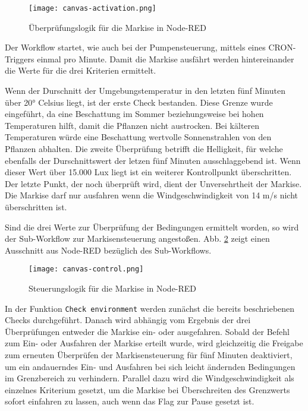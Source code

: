 \begin{figure}[h]
  \centering
  \texttt{[image: canvas-activation.png]}
  \caption{Überprüfungslogik für die Markise in Node-RED}\label{fig:canvas-activation}
\end{figure}

Der Workflow startet, wie auch bei der Pumpensteuerung, mittels eines CRON-Triggers einmal pro Minute. Damit die Markise ausfährt werden hintereinander die Werte für die drei Kriterien ermittelt.

Wenn der Durschnitt der Umgebungstemperatur in den letzten fünf Minuten über 20° Celsius liegt, ist der erste Check bestanden. Diese Grenze wurde eingeführt, da eine Beschattung im Sommer beziehungsweise bei hohen Temperaturen hilft, damit die Pflanzen nicht austrocken. Bei kälteren Temperaturen würde eine Beschattung wertvolle Sonnenstrahlen von den Pflanzen abhalten. Die zweite Überprüfung betrifft die Helligkeit, für welche ebenfalls der Durschnittswert der letzen fünf Minuten ausschlaggebend ist. Wenn dieser Wert über 15.000 Lux liegt ist ein weiterer Kontrollpunkt überschritten. Der letzte Punkt, der noch überprüft wird, dient der Unversehrtheit der Markise. Die Markise darf nur ausfahren wenn die Windgeschwindigkeit von 14 m/s nicht überschritten ist.

Sind die drei Werte zur Überprüfung der Bedingungen ermittelt worden, so wird der Sub-Workflow zur Markisensteuerung angestoßen. Abb. \ref{fig:canvas-control} zeigt einen Ausschnitt aus Node-RED bezüglich des Sub-Workflows.

\begin{figure}[h]
  \centering
  \texttt{[image: canvas-control.png]}
  \caption{Steuerungslogik für die Markise in Node-RED}\label{fig:canvas-control}
\end{figure}

In der Funktion \texttt{Check environment} werden zunächst die bereits beschriebenen Checks durchgeführt. Danach wird abhängig vom Ergebnis der drei Überprüfungen entweder die Markise ein- oder ausgefahren.
Sobald der Befehl zum Ein- oder Ausfahren der Markise erteilt wurde, wird gleichzeitig die Freigabe zum erneuten Überprüfen der Markisensteuerung für fünf Minuten deaktiviert, um ein andauerndes Ein- und Ausfahren bei sich leicht ändernden Bedingungen im Grenzbereich zu verhindern. Parallel dazu wird die Windgeschwindigkeit als einzelnes Kriterium gesetzt, um die Markise bei Überschreiten des Grenzwerts sofort einfahren zu lassen, auch wenn das Flag zur Pause gesetzt ist.

